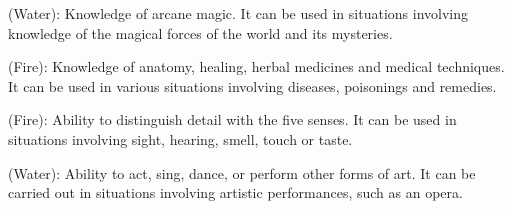 \begin{multicols}{2}
\begin{ffcolpage}
 (Water): Knowledge of arcane magic. It can be used in situations involving knowledge of the magical forces of the world and its mysteries.
\end{ffcolpage} \pw \begin{ffcolpage}
 (Fire): Knowledge of anatomy, healing, herbal medicines and medical techniques. It can be used in various situations involving diseases, poisonings and remedies.
\end{ffcolpage} \pw \begin{minipage}{.35\textwidth}
 (Fire): Ability to distinguish detail with the five senses. It can be used in situations involving sight, hearing, smell, touch or
taste. 
\par\pw
{} (Water): Ability to act, sing, dance, or perform other forms of art. It can be carried out in situations involving artistic performances, such as an opera.
\end{minipage}
\parbox{.15\textwidth}{
}
\pw


\end{multicols}

